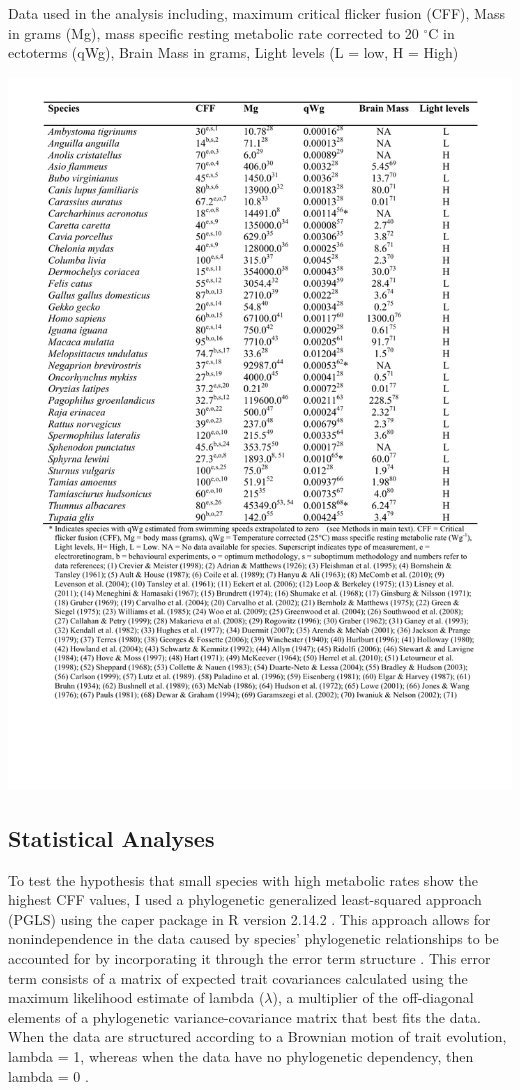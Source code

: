 \begin{table}[!Hp]
  \caption[ ]{Data used in the analysis including, maximum critical flicker fusion (CFF), Mass in grams (Mg), mass specific resting metabolic rate corrected to 20 $^{\circ}$C in ectoterms (qWg), Brain Mass in grams, Light levels (L = low, H = High)}
  \label{tbl:Table 2.1}
  \includegraphics[width=1.0\linewidth]{ch2-time/Table_1}
\end{table}


\subsection{Statistical Analyses}
To test the hypothesis that small species with high metabolic rates show the highest CFF values, I used a phylogenetic generalized least-squared approach (PGLS) using the caper package \citep{orme2011caper} in R version 2.14.2 \citep{RCran}. This approach allows for nonindependence in the data caused by species' phylogenetic relationships to be accounted for by incorporating it through the error term structure \citep{pagel1999inferring,rohlf2001comparative}. This error term consists of a matrix of expected trait covariances calculated using the maximum likelihood estimate of lambda ($\lambda$), a multiplier of the off-diagonal elements of a phylogenetic variance-covariance matrix that best fits the data. When the data are structured according to a Brownian motion of trait evolution, lambda = 1, whereas when the data have no phylogenetic dependency, then lambda = 0 \citep{pagel1999inferring}.


